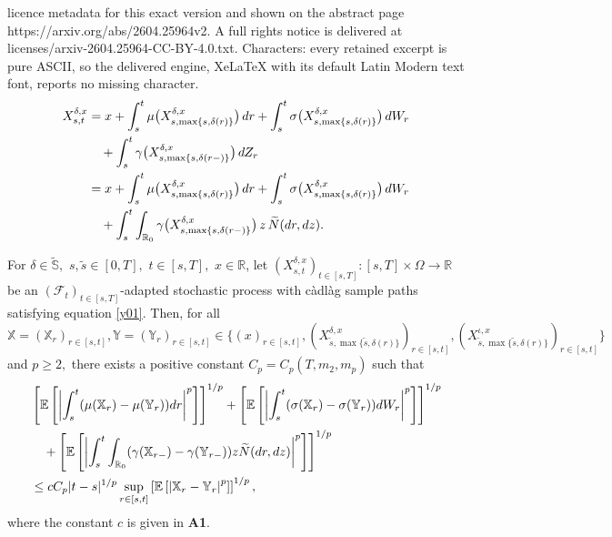 \documentclass[10pt,a4paper]{amsart}
\newcommand{\bR}{\mathbb{R}}
\newcommand{\mf}{\mathcal{F}}
\begin{document}
licence metadata for this exact version and shown on the abstract page https://arxiv.org/abs/2604.25964v2. A full rights notice is delivered at licenses/arxiv-2604.25964-CC-BY-4.0.txt. Characters: every retained excerpt is pure ASCII, so the delivered engine, XeLaTeX with its default Latin Modern text font, reports no missing character.
\begin{align}
\label{y01}
 X^{\delta,x}_{s,t}
&=
x+\int_{s}^{t}\mu\bigl(X^{\delta,x}_{s,\max\{s,\delta(r)\}}\bigr)\,dr
+\int_{s}^{t}\sigma\bigl(X^{\delta,x}_{s,\max\{s,\delta(r)\}}\bigr)\,dW_r
\notag\\
&\quad
+\int_{s}^{t}\gamma\bigl(X^{\delta,x}_{s,\max\{s,\delta(r-)\}}\bigr)\,dZ_r
\notag\\
&=
x+\int_{s}^{t}\mu\bigl(X^{\delta,x}_{s,\max\{s,\delta(r)\}}\bigr)\,dr
+\int_{s}^{t}\sigma\bigl(X^{\delta,x}_{s,\max\{s,\delta(r)\}}\bigr)\,dW_r
\notag\\
&\quad
+\int_{s}^{t}\int_{\mathbb{R}_0}
\gamma\bigl(X^{\delta,x}_{s,\max\{s,\delta(r-)\}}\bigr)
\,z\,\widetilde{N}(dr,dz).
\end{align}

\begin{Lem}
\label{Lem3.2}
For $\delta \in \widetilde{\mathbb{S}},$ $s, \widetilde{s} \in [0,T],$ $t\in [s, T],$  $x \in\mathbb{R}$, let $(X^{\delta,x}_{s,t})_{t\in[s,T]}:[s,T]  \times\Omega\to\mathbb{R} $ 
be an $(\mf_t)_{t\in[s,T]}$-adapted stochastic process with c\`adl\`ag  sample paths satisfying equation \eqref{y01}. Then, for all $\mathbb{X}=(\mathbb{X}_r)_{r\in [s, t]}, \mathbb{Y}=(\mathbb{Y}_r)_{r\in [s, t]} \in \{ (x)_{r\in [s, t]}, (X_{\widetilde{s},\max\{\widetilde{s},\delta(r)\}}^{\delta,x})_{r\in [s, t]}, (X_{\widetilde{s},\max\{\widetilde{s},\delta (r) \}}^{\iota,x})_{r\in [s, t]}  \}$ and $p\ge 2,$ there exists a positive constant $C_p=C_p(T,m_2,m_p)$ such that
\begin{align*}
&\left[\mathbb{E} \left[\left| \int_s^t (\mu(\mathbb{X}_r)-\mu(\mathbb{Y}_r)) dr \right|^p \right]\right]^{1/p} + \left[\mathbb{E} \left[\left| \int_s^t (\sigma(\mathbb{X}_r)-\sigma(\mathbb{Y}_r)) dW_r \right|^p \right]\right]^{1/p} \notag \\ 
& \quad + \left[\mathbb{E} \left[ \left| \int_s^t \int_{\bR_0} (\gamma(\mathbb{X}_{r-})-\gamma(\mathbb{Y}_{r-})) z \widetilde{N}(dr, dz) \right|^p \right]\right]^{1/p} \notag \\
 & \leq c  C_p  |t-s|^{1/p} \sup_{r\in [s, t]} \left[ \mathbb{E} \left[\left| \mathbb{X}_r-\mathbb{Y}_r \right|^p \right]\right]^{1/p},
\end{align*}
where the constant $c$ is given in {\bf A1}.
\end{Lem}
\end{document}
